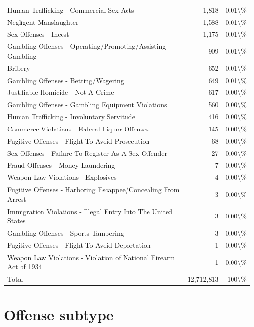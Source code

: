 \documentclass[
  12pt,
  openany]{book}
\begin{document}
\begin{longtable}[t]{lrr}
Human Trafficking - Commercial Sex Acts & 1,818 & 0.01\textbackslash{}\%\\
Negligent Manslaughter & 1,588 & 0.01\textbackslash{}\%\\
Sex Offenses - Incest & 1,175 & 0.01\textbackslash{}\%\\
\addlinespace
Gambling Offenses - Operating/Promoting/Assisting Gambling & 909 & 0.01\textbackslash{}\%\\
Bribery & 652 & 0.01\textbackslash{}\%\\
Gambling Offenses - Betting/Wagering & 649 & 0.01\textbackslash{}\%\\
Justifiable Homicide - Not A Crime & 617 & 0.00\textbackslash{}\%\\
Gambling Offenses - Gambling Equipment Violations & 560 & 0.00\textbackslash{}\%\\
\addlinespace
Human Trafficking - Involuntary Servitude & 416 & 0.00\textbackslash{}\%\\
Commerce Violations - Federal Liquor Offenses & 145 & 0.00\textbackslash{}\%\\
Fugitive Offenses - Flight To Avoid Prosecution & 68 & 0.00\textbackslash{}\%\\
Sex Offenses - Failure To Register As A Sex Offender & 27 & 0.00\textbackslash{}\%\\
Fraud Offenses - Money Laundering & 7 & 0.00\textbackslash{}\%\\
\addlinespace
Weapon Law Violations - Explosives & 4 & 0.00\textbackslash{}\%\\
Fugitive Offenses - Harboring Escappee/Concealing From Arrest & 3 & 0.00\textbackslash{}\%\\
Immigration Violations - Illegal Entry Into The United States & 3 & 0.00\textbackslash{}\%\\
Gambling Offenses - Sports Tampering & 3 & 0.00\textbackslash{}\%\\
Fugitive Offenses - Flight To Avoid Deportation & 1 & 0.00\textbackslash{}\%\\
\addlinespace
Weapon Law Violations - Violation of National Firearm Act of 1934 & 1 & 0.00\textbackslash{}\%\\
Total & 12,712,813 & 100\textbackslash{}\%\\
\bottomrule
\end{longtable}

\section{Offense subtype}\label{offense-subtype}
\end{document}
